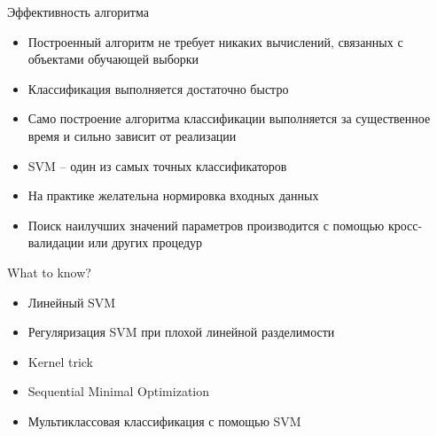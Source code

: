 \documentclass[red,unicode]{beamer}
\begin{document}
\begin{frame}{Эффективность алгоритма}
\begin{itemize}
	\item Построенный алгоритм не требует никаких вычислений, связанных с объектами обучающей выборки 
	\item Классификация выполняется достаточно быстро
	\item Само построение алгоритма классификации выполняется за существенное время и сильно зависит от реализации 
	\item SVM -- один из самых точных классификаторов
	\item На практике желательна нормировка входных данных
	\item Поиск наилучших значений параметров производится с помощью кросс-валидации или других процедур
\end{itemize}
\end{frame}




\begin{frame}{What to know?}
\begin{itemize}
	\item Линейный SVM
	\item Регуляризация SVM при плохой линейной разделимости
	\item Kernel trick
	\item Sequential Minimal Optimization
	\item Мультиклассовая классификация с помощью SVM
\end{itemize}
\end{frame}
\end{document}
